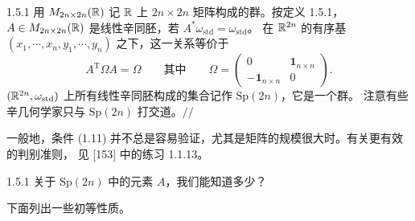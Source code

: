 \begin{wexam}{1.5.1}
用 $M_{2n\times2n}(\mathbb{R})$ 记 $\mathbb{R}$ 上 $2n\times2n$ 矩阵构成的群。按定义 1.5.1，
$A\in M_{2n\times2n}(\mathbb{R})$ 是线性辛同胚，若 $A^*\omega_{\mathrm{std}}=\omega_{\mathrm{std}}$。
在 $\mathbb{R}^{2n}$ 的有序基 $(x_1,\cdots,x_n,y_1,\cdots,y_n)$ 之下，这一关系等价于
\begin{equation}
  A^{\mathrm T}\Omega A=\Omega
  \qquad\text{其中}\qquad
  \Omega=\begin{pmatrix}0&\mathbf{1}_{n\times n}\\[1.5mm]
    -\mathbf{1}_{n\times n}&0\end{pmatrix}.
  \tag{1.11}
\end{equation}
$(\mathbb{R}^{2n},\omega_{\mathrm{std}})$ 上所有线性辛同胚构成的集合记作 $\mathrm{Sp}(2n)$，它是一个群。
注意有些辛几何学家只与 $\mathrm{Sp}(2n)$ 打交道。\hfill$//$
\end{wexam}

一般地，条件 (1.11) 并不总是容易验证，尤其是矩阵的规模很大时。有关更有效的判别准则，
见 [153] 中的练习 1.1.13。

\begin{wque}{1.5.1}
关于 $\mathrm{Sp}(2n)$ 中的元素 $A$，我们能知道多少？
\end{wque}

下面列出一些初等性质。


